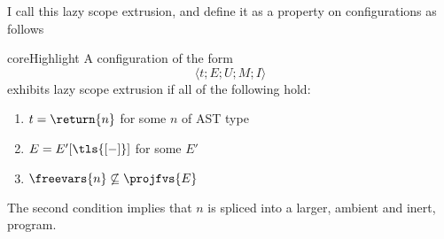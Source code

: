 I call this lazy scope extrusion, and define it as a property on \coreLang{} configurations as follows 
\begin{definition}{coreHighlight}\label{def:lazy-scope-extrusion} A \coreLang{} configuration of the form 
\[\langle t;E;U;M;I\rangle\]  
exhibits lazy scope extrusion if all of the following hold:
  \begin{enumerate}
    \item $t = \return{n}$ for some $n$ of \textsf{AST} type
    \item $E = E'[\tls{[-]}]$ for some $E'$
    \item $\freevars{n} \not\subseteq \projfvs{E}$
  \end{enumerate}
\end{definition}

The second condition implies that $n$ is spliced into a larger, ambient and inert, program. 

